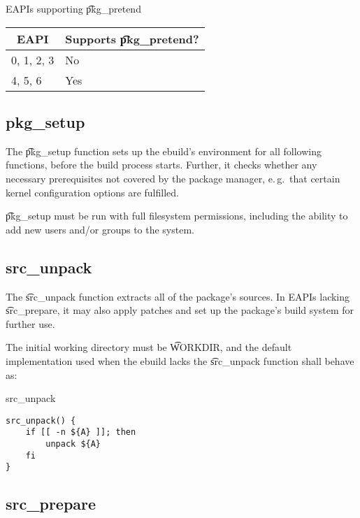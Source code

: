 \begin{centertable}{EAPIs supporting \t{pkg\_pretend}}
    \label{tab:pkg-pretend-table}
    \begin{tabular}{ll}
      \toprule
      \multicolumn{1}{c}{\textbf{EAPI}} &
      \multicolumn{1}{c}{\textbf{Supports \t{pkg\_pretend}?}} \\
      \midrule
      0, 1, 2, 3        & No  \\
      4, 5, 6           & Yes \\
      \bottomrule
    \end{tabular}
\end{centertable}

\subsection{pkg\_setup}
\label{sec:pkg-setup-function}
The \t{pkg\_setup} function sets up the ebuild's environment for all following functions, before
the build process starts. Further, it checks whether any necessary prerequisites not covered
by the package manager, e.\,g.\ that certain kernel configuration options are fulfilled.

\t{pkg\_setup} must be run with full filesystem permissions, including the ability to add new users
and/or groups to the system.

\subsection{src\_unpack}
\label{sec:src-unpack-function}

 The \t{src\_unpack} function extracts all of
the package's sources. In EAPIs lacking \t{src\_prepare}, it may also
apply patches and set up the package's build system for further use.

The initial working directory must be \t{WORKDIR}, and the default implementation used when
the ebuild lacks the \t{src\_unpack} function shall behave as:

\begin{listing}[H]
\caption{src\_unpack} \label{lst:src-unpack}
\begin{verbatim}
src_unpack() {
    if [[ -n ${A} ]]; then
        unpack ${A}
    fi
}
\end{verbatim}
\end{listing}

\subsection{src\_prepare}
\label{sec:src-prepare-function}

